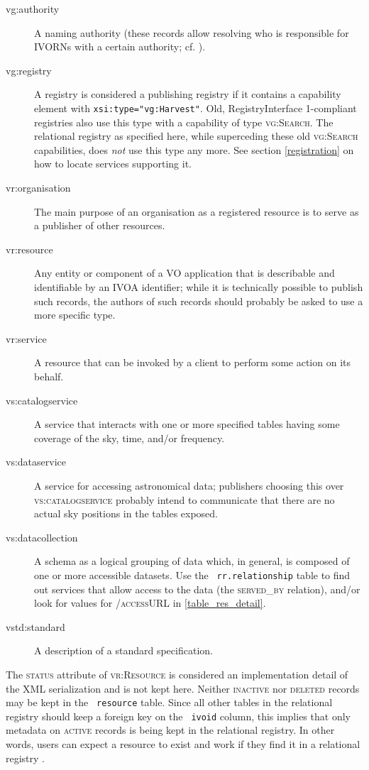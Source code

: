 \documentclass[11pt,a4paper]{ivoa}
\newcommand{\rtent}[1]{\texttt{\color{rtcolor} #1}}
\newcommand{\vorent}[1]{\textsc{#1}}
\begin{document}
\begin{description}
\item[vg:authority]A naming authority (these records allow resolving who is responsible
for IVORNs with a certain authority; cf. \citep{std:VOID}).
\item[vg:registry]A registry is considered a publishing registry if it contains a
capability element with \texttt{xsi:type="vg:Harvest"}.  Old,
RegistryInterface 1-compliant registries also use this type with a
capability of type \vorent{vg:Search}.  The relational registry as
specified here, while superceding these old \vorent{vg:Search}
capabilities, does \emph{not} use this type any more.  See section
\ref{registration} on how to locate services
supporting it.
\item[vr:organisation]The main purpose of an organisation as a registered resource is to
serve as a publisher of other resources.
\item[vr:resource]Any entity or component of a VO application that is describable and
identifiable by an IVOA identifier; while it is technically possible to
publish such records, the authors of such records should probably be
asked to use a more specific type.
\item[vr:service]A resource that can be invoked by a client to perform some action on
its behalf.
\item[vs:catalogservice]A service that interacts with one or more specified tables having
some coverage of the sky, time, and/or frequency.
\item[vs:dataservice]A service for accessing astronomical data; publishers choosing
this over \vorent{vs:catalogservice} probably intend to communicate
that there are no actual sky positions in the tables exposed.
\item[vs:datacollection]A schema as a logical grouping of data which, in general, is
composed of one or more accessible datasets.  Use the
\rtent{rr.relationship} table to find out services that allow
access to the data (the \vorent{served\_by} relation), and/or look for values for
\vorent{/accessURL} in
\ref{table_res_detail}.
\item[vstd:standard]A description of a standard specification.

\end{description}

The \vorent{status} attribute of \vorent{vr:Resource} is
considered an implementation detail of the XML serialization and is not
kept here.  Neither \vorent{inactive} nor \vorent{deleted}
records may be kept in the \rtent{resource} table.  Since all
other tables in the relational registry should keep a foreign key on the
\rtent{ivoid} column, this implies that only metadata on
\vorent{active} records 
is being kept in the relational registry. In other words, users can
expect a resource to exist and work if they find it in a relational 
registry .
\end{document}
